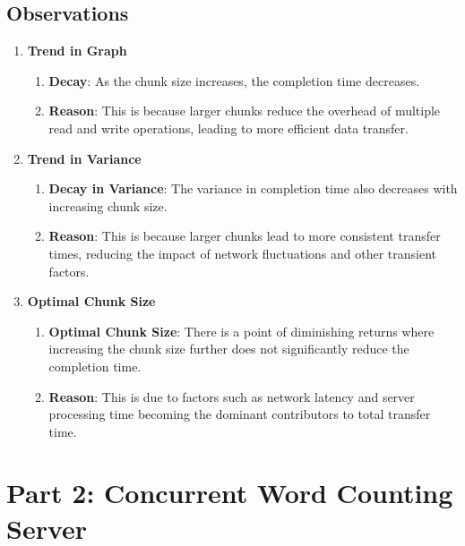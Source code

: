 \documentclass[12pt]{article}
\begin{document}
\subsection{Observations}
\begin{enumerate}
    \item \textbf{Trend in Graph}
    \begin{enumerate}
        \item \textbf{Decay}: As the chunk size increases, the completion time decreases. 
        \item \textbf{Reason}: This is because larger chunks reduce the overhead of multiple read and write operations, leading to more efficient data transfer.
    \end{enumerate}
    \item \textbf{Trend in Variance}
    \begin{enumerate}
        \item \textbf{Decay in Variance}: The variance in completion time also decreases with increasing chunk size.
        \item \textbf{Reason}: This is because larger chunks lead to more consistent transfer times, reducing the impact of network fluctuations and other transient factors.
    \end{enumerate}
    \item \textbf{Optimal Chunk Size}
    \begin{enumerate}
        \item \textbf{Optimal Chunk Size}: There is a point of diminishing returns where increasing the chunk size further does not significantly reduce the completion time.
        \item \textbf{Reason}: This is due to factors such as network latency and server processing time becoming the dominant contributors to total transfer time.
    \end{enumerate}
    
\end{enumerate}

\section{Part 2: Concurrent Word Counting Server}
\end{document}
